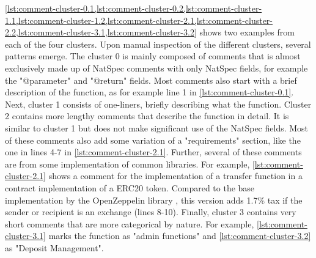\cref{lst:comment-cluster-0.1,lst:comment-cluster-0.2,lst:comment-cluster-1.1,lst:comment-cluster-1.2,lst:comment-cluster-2.1,lst:comment-cluster-2.2,lst:comment-cluster-3.1,lst:comment-cluster-3.2} shows two examples from each of the four clusters. Upon manual inspection of the different clusters, several patterns emerge. The cluster 0 is mainly composed of comments that is almost exclusively made up of NatSpec comments with only NatSpec fields, for example the "@parameter" and "@return" fields. Most comments also start with a brief description of the function, as for example line 1 in \cref{lst:comment-cluster-0.1}. Next, cluster 1 consists of one-liners, briefly describing what the function. Cluster 2 contains more lengthy comments that describe the function in detail. It is similar to cluster 1 but does not make significant use of the NatSpec fields. Most of these comments also add some variation of a "requirements" section, like the one in lines 4-7 in \cref{lst:comment-cluster-2.1}. Further, several of these comments are from some implementation of common libraries. For example, \cref{lst:comment-cluster-2.1} shows a comment for the implementation of a transfer function in a contract implementation of a ERC20 token. Compared to the base implementation by the OpenZeppelin library \cite{openzeppelin}, this version adds 1.7\% tax if the sender or recipient is an exchange (lines 8-10). Finally, cluster 3 contains very short comments that are more categorical by nature. For example, \cref{lst:comment-cluster-3.1} marks the function as "admin functions" and \cref{lst:comment-cluster-3.2} as "Deposit Management".


